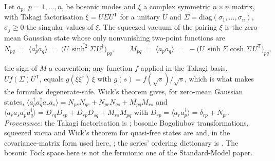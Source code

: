 Let $a_{p}$, $p = 1, \dots, n$, be bosonic modes and $\xi$ a complex symmetric $n \times n$ matrix, with Takagi factorisation $\xi = U\Sigma U^{\mathsf{T}}$ for a unitary $U$ and $\Sigma = \mathrm{diag}(\sigma_{1}, \dots, \sigma_{n})$, $\sigma_{j} \ge 0$ the singular values of $\xi$. The squeezed vacuum of the pairing $\xi$ is the zero-mean Gaussian state whose only nonvanishing two-point functions are
\[
N_{pq} \;=\; \langle a_{p}^{\dagger}a_{q}\rangle \;=\; \overline{\bigl(U\,\sinh^{2}\!\Sigma\,U^{\dagger}\bigr)}_{pq}, \qquad
M_{pq} \;=\; \langle a_{p}a_{q}\rangle \;=\; -\bigl(U\,\sinh\Sigma\cosh\Sigma\,U^{\mathsf{T}}\bigr)_{pq},
\]

the sign of $M$ a convention; any function $f$ applied in the Takagi basis, $U f(\Sigma) U^{\mathsf{T}}$, equals $g(\xi\xi^{\dagger})\,\xi$ with $g(s) = f(\sqrt{s})/\sqrt{s}$, which is what makes the formulas degenerate-safe. Wick's theorem gives, for zero-mean Gaussian states, $\langle a_{p}^{\dagger}a_{q}^{\dagger}a_{r}a_{s}\rangle = N_{ps}N_{qr} + N_{pr}N_{qs} + \overline{M_{pq}}M_{rs}$ and $\langle a_{r}a_{s}a_{p}^{\dagger}a_{q}^{\dagger}\rangle = D_{rq}D_{sp} + D_{rp}D_{sq} + M_{rs}\overline{M_{pq}}$ with $D_{rp} = \langle a_{r}a_{p}^{\dagger}\rangle = \delta_{rp} + N_{pr}$. \emph{Provenance:} the Takagi factorisation is \cite[Cor.~4.4.4]{HornJohnson}; bosonic Bogoliubov transformations, squeezed vacua and Wick's theorem for quasi-free states are \cite[Ch.~2-3]{Berezin1966} and, in the covariance-matrix form used here, \cite[\S II]{Weedbrook2012}; the series' ordering dictionary is \cite[Thm.~5.7]{ButlerT9}. The bosonic Fock space here is not the fermionic one of the Standard-Model paper.
